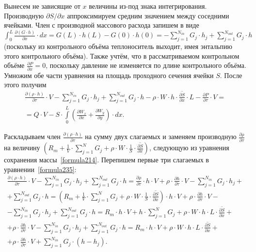 Вынесем не зависящие от $x$ величины из-под знака интегрирования. Производную $\partial S/\partial x$ аппроксимируем средним значением между соседними ячейками. Член с производной массового расхода запишем в виде $\int_{0}^{L} \frac{\partial(G \cdot h)}{\partial x} \cdot dx=G(L)\cdot h(L)-G(0)\cdot h(0)=-\sum_{j=1}^{N_{in}} G_j \cdot h_j + \sum_{j=1}^{N_{out}} G_j \cdot h$ (поскольку из контрольного объёма теплоноситель выходит, имея энтальпию этого контрольного объёма). Также учтём, что в рассматриваемом контрольном объёме $\frac{\partial P}{\partial x}=0$, поскольку давление не изменяется по длине контрольного объёма. Умножим обе части уравнения на площадь проходного сечения ячейки $S$. После этого получим
\begin{eqnarray}
\label{formula235}
\frac{\partial(\rho\cdot h)}{\partial\tau}\cdot V-\sum_{j=1}^{N_{in}} G_j \cdot h_j + \sum_{j=1}^{N_{out}} G_j \cdot h - \rho\cdot W \cdot h \cdot \overline{\frac{\partial S}{\partial x}} \cdot L - \frac{\partial P}{\partial\tau}\cdot V = \nonumber ~\\
= Q\cdot V - S \cdot \int\limits_{0}^{L} \left(\frac{\partial W_x}{\partial x} + \frac{\partial W_y}{\partial y} \right) \cdot dx.
\end{eqnarray}

Раскладываем член $\frac{\partial(\rho\cdot h)}{\partial\tau}$ на сумму двух слагаемых и заменяем производную $\frac{\partial\rho}{\partial\tau}$ на величину $\left( R_m + \frac 1 V \cdot \sum_{j=1}^{N} G_j + \rho\cdot W \cdot \frac 1 S \cdot \overline{\frac{\partial S}{\partial x}} \right)$, следующую из уравнения сохранения массы~\eqref{formula214}. Перепишем первые три слагаемых в уравнении~\eqref{formula235}:
\begin{eqnarray}
\label{formula236}
\frac{\partial(\rho\cdot h)}{\partial\tau}\cdot V-\sum_{j=1}^{N_{in}} G_j \cdot h_j + \sum_{j=1}^{N_{out}} G_j \cdot h = \frac{\partial\rho}{\partial\tau}\cdot h \cdot V + \rho\cdot \frac{\partial h}{\partial\tau}\cdot V -\sum_{j=1}^{N_{in}} G_j \cdot h_j + \nonumber ~\\
+ \sum_{j=1}^{N_{out}} G_j \cdot h = \left( R_m + \frac 1 V \cdot \sum_{j=1}^{N} G_j + \rho\cdot W \cdot \frac 1 S \cdot \overline{\frac{\partial S}{\partial x}} \right)\cdot h \cdot V + \rho\cdot \frac{\partial h}{\partial\tau}\cdot V - \nonumber ~\\
-\sum_{j=1}^{N_{in}} G_j \cdot h_j + \sum_{j=1}^{N_{out}} G_j \cdot h = R_m \cdot h \cdot V + h\cdot\sum_{j=1}^{N} G_j + \rho\cdot W \cdot h \cdot L \cdot \overline{\frac{\partial S}{\partial x}} + \nonumber ~\\
+ \rho\cdot \frac{\partial h}{\partial\tau}\cdot V -\sum_{j=1}^{N_{in}} G_j \cdot h_j + \sum_{j=1}^{N_{out}} G_j \cdot h = R_m \cdot h \cdot V + \rho\cdot W \cdot h \cdot L \cdot \overline{\frac{\partial S}{\partial x}} + \nonumber ~\\
+ \rho\cdot \frac{\partial h}{\partial\tau}\cdot V + \sum_{j=1}^{N_{in}} G_j \cdot (h-h_j).
\end{eqnarray}

